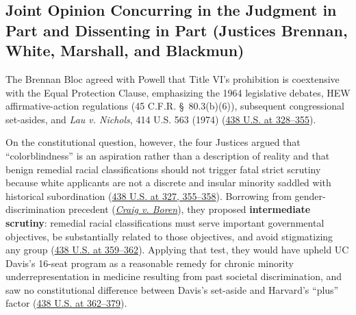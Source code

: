 \documentclass[12pt]{article}
\begin{document}
\subsection{Joint Opinion Concurring in the Judgment in Part and Dissenting in Part (Justices Brennan, White, Marshall, and Blackmun)}
The Brennan Bloc agreed with Powell that Title VI's prohibition is coextensive with the Equal Protection Clause, emphasizing the 1964 legislative debates, HEW affirmative-action regulations (45 C.F.R. \S~80.3(b)(6)), subsequent congressional set-asides, and \textit{Lau v. Nichols}, 414 U.S. 563 (1974) (\href{https://supreme.justia.com/cases/federal/us/438/265/}{438 U.S. at 328--355}).

On the constitutional question, however, the four Justices argued that ``colorblindness'' is an aspiration rather than a description of reality and that benign remedial racial classifications should not trigger fatal strict scrutiny because white applicants are not a discrete and insular minority saddled with historical subordination (\href{https://supreme.justia.com/cases/federal/us/438/265/}{438 U.S. at 327, 355--358}). Borrowing from gender-discrimination precedent (\href{https://supreme.justia.com/cases/federal/us/429/190/}{\textit{Craig v. Boren}}), they proposed \textbf{intermediate scrutiny}: remedial racial classifications must serve important governmental objectives, be substantially related to those objectives, and avoid stigmatizing any group (\href{https://supreme.justia.com/cases/federal/us/438/265/}{438 U.S. at 359--362}). Applying that test, they would have upheld UC Davis's 16-seat program as a reasonable remedy for chronic minority underrepresentation in medicine resulting from past societal discrimination, and saw no constitutional difference between Davis's set-aside and Harvard's ``plus'' factor (\href{https://supreme.justia.com/cases/federal/us/438/265/}{438 U.S. at 362--379}).
\end{document}
